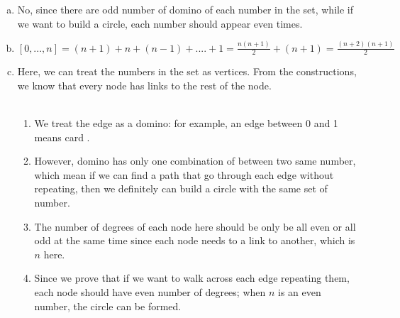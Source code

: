 \documentclass{article}
\def\math#1{$#1$}
\begin{document}
\begin{enumerate}[a)]
    \item No, since there are odd number of domino of each number in the set, while if we want to build a circle, each number should appear even times.
    \item \math{[0,...,n] = (n + 1)+ n + (n - 1) + .... + 1 = \frac{n(n+1)}{2} + (n + 1) = \frac{(n+2)(n+1)}{2}}
    \item Here, we can treat the numbers in the set as vertices. From the constructions, we know that every node has links to the rest of the node.  \\\\
    \begin{enumerate}
        \item  We treat the edge as a domino: for example, an edge between 0 and 1 means card .
        \item  However, domino has only one combination of between two same number, which mean if we can find a path that go through each edge without repeating, then we definitely can build a circle with the same set of number. 
        \item The number of degrees of each node here should be only be all even or all odd at the same time since each node needs to a link to another, which is \math{n} here.
        \item Since we prove that if we want to walk across each edge repeating them, each node should have even number of degrees; when \math{n} is an even number, the circle can be formed.
    \end{enumerate}
\end{enumerate}
\end{document}
